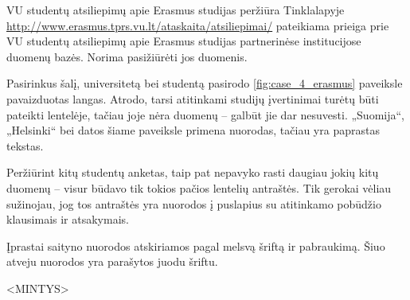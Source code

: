 \begin{xcase}{VU studentų atsiliepimų apie Erasmus studijas peržiūra}
  \xcgoal
  {
    Tinklalapyje \url{http://www.erasmus.tprs.vu.lt/ataskaita/atsiliepimai/}
    pateikiama prieiga prie VU studentų atsiliepimų apie Erasmus studijas
    partnerinėse institucijose duomenų bazės. Norima pasižiūrėti jos duomenis.
  }
  
  \xctools
  {
    Pasirinkus šalį, universitetą bei studentą pasirodo
    \ref{fig:case_4_erasmus} paveiksle pavaizduotas langas. Atrodo, tarsi
    atitinkami studijų įvertinimai turėtų būti pateikti lentelėje, tačiau
    joje nėra duomenų – galbūt jie dar nesuvesti. „Suomija“, „Helsinki“ bei
    datos šiame paveiksle primena nuorodas, tačiau yra paprastas tekstas.

  }
  
  \xcresult
  {
    Peržiūrint kitų studentų anketas, taip pat nepavyko rasti daugiau jokių
    kitų duomenų – visur būdavo tik tokios pačios lentelių antraštės. Tik
    gerokai vėliau sužinojau, jog tos antraštės yra nuorodos į puslapius
    su atitinkamo pobūdžio klausimais ir atsakymais.
  }
  
  \xcprinciples
  {
    {
      Įprastai saityno nuorodos atskiriamos pagal melsvą šriftą ir
      pabraukimą. Šiuo atveju nuorodos yra parašytos juodu šriftu.
    }
  }
  
  \xcthoughts
  {
    <MINTYS>
  }
\end{xcase}
